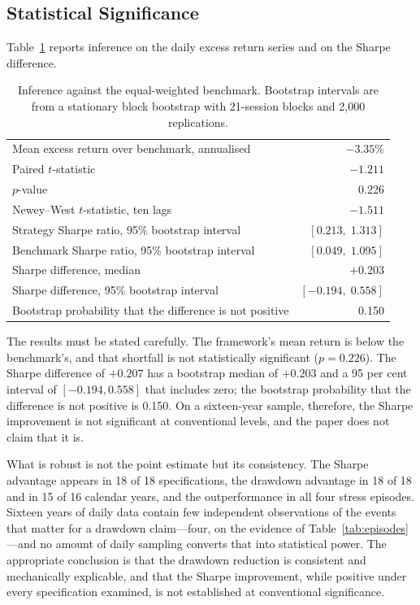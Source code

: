 \subsection{Statistical Significance}

Table~\ref{tab:inference} reports inference on the daily excess return series and on the Sharpe
difference.

\begin{table}[!ht]
\centering
\caption{Inference against the equal-weighted benchmark. Bootstrap intervals are from a
stationary block bootstrap with 21-session blocks and 2{,}000 replications.}
\label{tab:inference}
\small
\begin{tabular}{p{6.4cm}r}
\hline
Mean excess return over benchmark, annualised & $-3.35$\% \\
Paired $t$-statistic & $-1.211$ \\
$p$-value & 0.226 \\
Newey--West $t$-statistic, ten lags & $-1.511$ \\
\hline
Strategy Sharpe ratio, 95\% bootstrap interval & $[0.213, \; 1.313]$ \\
Benchmark Sharpe ratio, 95\% bootstrap interval & $[0.049, \; 1.095]$ \\
Sharpe difference, median & $+0.203$ \\
Sharpe difference, 95\% bootstrap interval & $[-0.194, \; 0.558]$ \\
Bootstrap probability that the difference is not positive & 0.150 \\
\hline
\end{tabular}
\end{table}

The results must be stated carefully. The framework's mean return is below the
benchmark's, and that shortfall is not statistically significant ($p = 0.226$). The
Sharpe difference of $+0.207$ has a bootstrap median of $+0.203$ and a 95 per cent
interval of $[-0.194, 0.558]$ that includes zero; the bootstrap probability that the
difference is not positive is 0.150. On a sixteen-year sample, therefore, the Sharpe
improvement is not significant at conventional levels, and the paper does not claim
that it is.

What is robust is not the point estimate but its consistency. The Sharpe advantage
appears in 18 of 18 specifications, the drawdown advantage in 18 of 18 and in 15 of 16
calendar years, and the outperformance in all four stress episodes. Sixteen years of
daily data contain few independent observations of the events that matter for a
drawdown claim---four, on the evidence of Table~\ref{tab:episodes}---and no amount of daily sampling
converts that into statistical power. The appropriate conclusion is that the drawdown
reduction is consistent and mechanically explicable, and that the Sharpe improvement,
while positive under every specification examined, is not established at conventional
significance.

